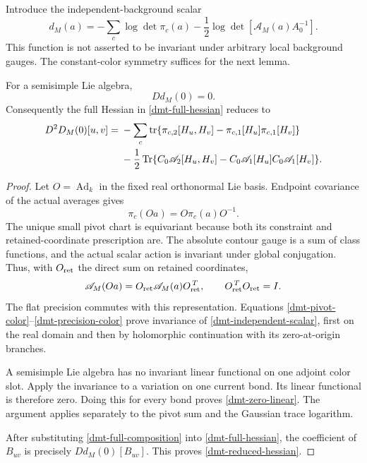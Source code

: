 Introduce the independent-background scalar
\begin{equation}
 d_M(a)=-\sum_c\log\det\pi_c(a)
       -\frac12\log\det[\mathscr A_M(a)A_0^{-1}].
 \label{dmt-independent-scalar}
\end{equation}
This function is not asserted to be invariant under arbitrary
local background gauges. The constant-color symmetry suffices
for the next lemma.

\begin{lemma}
\label{dmt-linear-cancellation}
For a semisimple Lie algebra,
\begin{equation}
                         Dd_M(0)=0.
 \label{dmt-zero-linear}
\end{equation}
Consequently the full Hessian in
\eqref{dmt-full-hessian} reduces to
\begin{align}
 D^2D_M(0)[u,v]
 ={}&-\sum_c\operatorname{tr}
 \{\pi_{c,2}[H_u,H_v]
       -\pi_{c,1}[H_u]\pi_{c,1}[H_v]\}\notag\\
 &-\frac12\operatorname{Tr}
 \{C_0\mathscr A_2[H_u,H_v]
       -C_0\mathscr A_1[H_u]C_0\mathscr A_1[H_v]\}.
 \label{dmt-reduced-hessian}
\end{align}
\end{lemma}
\begin{proof}
Let \(O=\operatorname{Ad}_k\) in the fixed real orthonormal
Lie basis. Endpoint covariance of the actual averages gives
\begin{equation}
                  \pi_c(Oa)=O\pi_c(a)O^{-1}.
 \label{dmt-pivot-color}
\end{equation}
The unique small pivot chart is equivariant because both
its constraint and retained-coordinate prescription are.
The absolute contour gauge is a sum of class functions,
and the actual scalar action is invariant under global
conjugation. Thus, with \(O_{\rm ret}\) the direct sum
on retained coordinates,
\begin{equation}
 \mathscr A_M(Oa)
       =O_{\rm ret}\mathscr A_M(a)O_{\rm ret}^{\,T},
 \qquad O_{\rm ret}^{\,T}O_{\rm ret}=I.
 \label{dmt-precision-color}
\end{equation}
The flat precision commutes with this representation.
Equations \eqref{dmt-pivot-color}--\eqref{dmt-precision-color}
prove invariance of \eqref{dmt-independent-scalar}, first
on the real domain and then by holomorphic continuation
with its zero-at-origin branches.

A semisimple Lie algebra has no invariant linear functional
on one adjoint color slot. Apply the invariance to a variation
on one current bond. Its linear functional is therefore zero.
Doing this for every bond proves \eqref{dmt-zero-linear}.
The argument applies separately to the pivot sum and the
Gaussian trace logarithm.

After substituting \eqref{dmt-full-composition} into
\eqref{dmt-full-hessian}, the coefficient of \(B_{uv}\)
is precisely \(Dd_M(0)[B_{uv}]\). This proves
\eqref{dmt-reduced-hessian}.
\end{proof}

